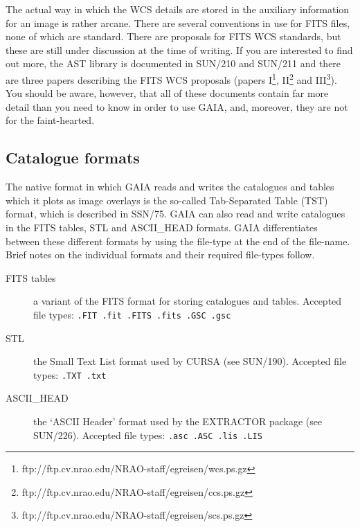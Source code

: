 \documentclass[twoside,11pt]{article}
\newcommand{\htmladdnormallinkfoot}[2]{#1\footnote{#2}}
\newcommand{\xref}[3]{#1}
\begin{document}
The actual way in which the WCS details are stored in the auxiliary
information for an image is rather arcane.  There are several
conventions in use for FITS files, none of which are standard.  There
are proposals for FITS WCS standards, but these are still under
discussion at the time of writing.  If you are interested to find out
more, the AST library is documented in \xref{SUN/210}{sun210}{}\cite{SUN210}
and \xref{SUN/211}{sun211}{}\cite{SUN211} and there are three papers
describing the FITS WCS proposals (papers
\htmladdnormallinkfoot{I}{ftp://ftp.cv.nrao.edu/NRAO-staff/egreisen/wcs.ps.gz},
\htmladdnormallinkfoot{II}{ftp://ftp.cv.nrao.edu/NRAO-staff/egreisen/ccs.ps.gz}
and
\htmladdnormallinkfoot{III}{ftp://ftp.cv.nrao.edu/NRAO-staff/egreisen/scs.ps.gz}).
You should be aware, however, that all of these documents contain far more
detail than you need to know in order to use GAIA, and, moreover, they
are not for the faint-hearted.

\subsection{\label{CATS}Catalogue formats}

The native format in which GAIA reads and writes the catalogues and tables
which it plots as image overlays is the so-called Tab-Separated Table (TST)
format, which is described in \xref{SSN/75}{ssn75}{}\cite{SSN75}.  GAIA
can also read and write catalogues in the FITS tables, STL and ASCII\_HEAD
formats.  GAIA differentiates between these different formats by using the
file-type at the end of the file-name.  Brief notes on the individual
formats and their required file-types follow.

\begin{description}

  \item[FITS tables] a variant of the FITS format for storing catalogues
   and tables.  Accepted file types: {\tt .FIT .fit .FITS .fits .GSC .gsc}

  \item[STL] the \xref{Small Text List format}{sun190}{STLTUT} used by
   CURSA (see \xref{SUN/190}{sun190}{}\cite{SUN190}).  Accepted file
   types: {\tt .TXT .txt}

  \item[ASCII\_HEAD] the `ASCII Header' format used by the EXTRACTOR
   package (see \xref{SUN/226}{sun226}{}\cite{SUN226}).  Accepted file
   types: {\tt .asc .ASC .lis .LIS}

\end{description}
\end{document}
